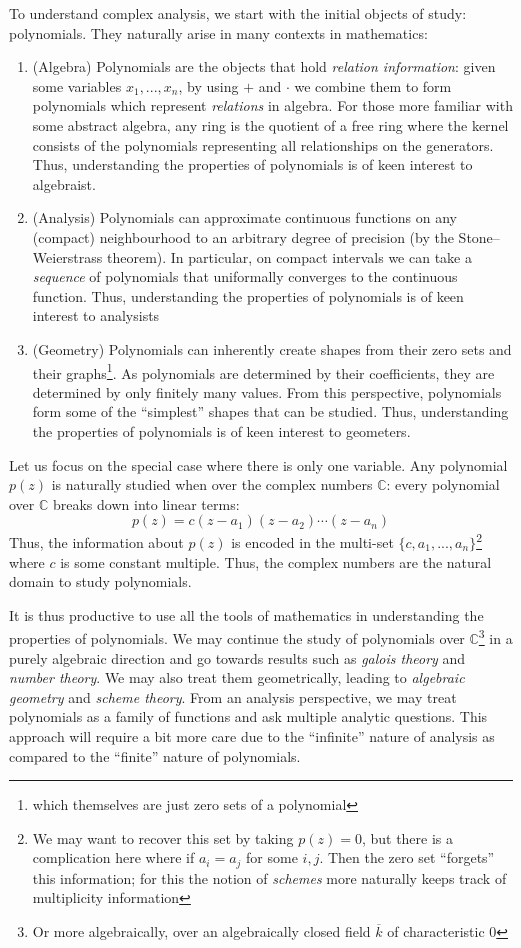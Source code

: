 \documentclass[oneside]{article}
\newcommand{\C}{\mathbb{C}}
\newcommand{\oln}{\overline}
\begin{document}
To understand complex analysis, we start with the initial objects of study: polynomials. They naturally arise
in many contexts in mathematics:
\begin{enumerate}
  \item (Algebra) Polynomials are the objects that hold \emph{relation information}: given some variables $x_1, ..., x_n$,
    by using $+$ and $\cdot$  we combine them to form polynomials which represent \emph{relations} in algebra. For those more
    familiar with some abstract algebra, any ring is the quotient of a free ring where the kernel consists of
    the polynomials representing all relationships on the generators. Thus, understanding the properties of
    polynomials is of keen interest to algebraist.
  \item (Analysis) Polynomials can approximate continuous functions on any (compact) neighbourhood to an
    arbitrary degree of precision (by the Stone–Weierstrass theorem). In particular, on compact intervals we can take
    a \emph{sequence} of polynomials that uniformally converges to the continuous function. Thus,
    understanding the properties of polynomials is of keen interest to analysists
   \item (Geometry) Polynomials can inherently create shapes from their zero sets and their
     graphs\footnote{which themselves are just zero sets of a polynomial}. As
     polynomials are determined by their coefficients, they are determined by only finitely many values.
     From this perspective, polynomials form some of the ``simplest'' shapes that can be studied. Thus,
     understanding the properties of polynomials is of keen interest to geometers.
 \end{enumerate}


Let us focus on the special case where there is only one variable. Any polynomial $p(z)$ is naturally studied
when over the complex numbers $\C$: every polynomial over $\C$ breaks down
into linear terms:
\[
  p(z) = c(z-a_1)(z-a_2)\cdots (z-a_n)
\]
Thus, the information about $p(z)$ is encoded in the multi-set $\{c, a_1, ..., a_n\}$\footnote{We may want to
recover this set by taking $p(z) = 0$, but there is a complication here where if $a_i = a_j$ for some $i,j$.
Then the zero set ``forgets'' this information; for this the notion of \emph{schemes} more naturally keeps
track of multiplicity information} where $c$ is some constant multiple. Thus, the complex numbers are the
natural domain to study polynomials.

It is thus productive to use all the tools of mathematics in understanding the properties of polynomials. We
may continue the study of polynomials over $\C$\footnote{Or more algebraically, over an algebraically closed
field $\oln{k}$ of characteristic $0$} in a purely algebraic direction and go towards results such as
\emph{galois theory} and \emph{number theory}. We may also treat them geometrically, leading to \emph{algebraic
geometry} and \emph{scheme theory}. From an analysis perspective, we may treat polynomials as a family of
functions and ask multiple analytic questions. This approach will require a bit more care due to the
``infinite'' nature of analysis as compared to the ``finite'' nature of polynomials.
\end{document}
